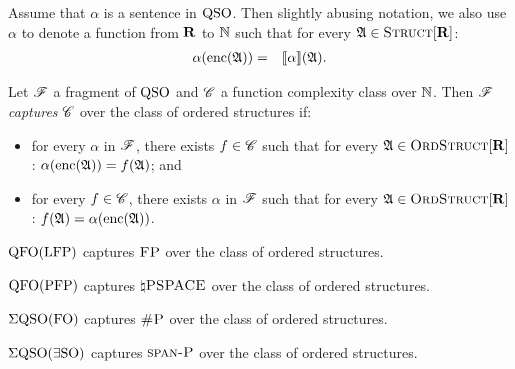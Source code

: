 

Assume that $\alpha$ is a sentence in ${\rm QSO}$. Then slightly abusing notation, we also use $\alpha$ to denote a function from $\mathbf{R}$ to $\mathbb{N}$ such that for every $\mathfrak{A} \in \text{\sc Struct}[\mathbf{R}] $:
\begin{eqnarray*}
	\alpha({\rm enc}(\mathfrak{A})) & = & {\llbracket{}{\alpha}\rrbracket}(\mathfrak{A}).
\end{eqnarray*}
\begin{definition}
	Let $\mathscr{F}$ a fragment of ${\rm QSO}$ and $\mathscr{C}$ a function complexity class over $\mathbb{N}$. Then $\mathscr{F}$ {\em captures} $\mathscr{C}$ over the class of ordered structures if:
	\begin{itemize}
		\item for every $\alpha$ in $\mathscr{F}$, there exists $f \in \mathscr{C}$ such that for every 
		$\mathfrak{A} \in \text{\sc OrdStruct}[\mathbf{R}]$:  $\alpha({\rm enc}(\mathfrak{A})) = f(\mathfrak{A})$; and
		
		\item for every $f \in \mathscr{C}$, there exists $\alpha$ in $\mathscr{F}$ such that for every 
		$\mathfrak{A} \in \text{\sc OrdStruct}[\mathbf{R}]$:  $f(\mathfrak{A}) = \alpha({\rm enc}(\mathfrak{A}))$.
	\end{itemize}
\end{definition}

\begin{theorem} \label{captfp}
	${\rm QFO}({\rm LFP})$ captures $\text{\sc FP}$ over the class of ordered structures.
\end{theorem}

\begin{theorem} \label{qfo-pfp-cap}
	${\rm QFO}({\rm PFP})$ captures $\natural\text{\sc PSPACE}$ over the class of ordered structures.
\end{theorem}

\begin{theorem} \label{eqso-fo-cap}
	$\Sigma{\rm QSO}({\rm FO})$ captures $\text{\sc \#P}$ over the class of ordered structures.
\end{theorem}

\begin{theorem} \label{eqso-eso-cap}
	$\Sigma{\rm QSO}(\exists{\rm SO})$ captures $\text{\sc span-P}$ over the class of ordered structures.
\end{theorem}
